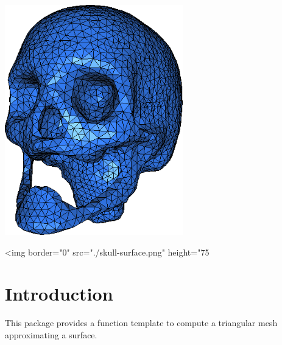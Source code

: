 \label{chapter_SurfaceMesher}



\minitoc


\begin{center}
 \begin{ccTexOnly}
   \includegraphics[height=10cm]{Surface_mesher/skull-surface}
 \end{ccTexOnly}
 \begin{ccHtmlOnly}
   <img border="0" src="./skull-surface.png" height="75%
 \end{ccHtmlOnly}
\end{center}

\section{Introduction}
\label{SurfaceMesher_section_intro}

This package provides a function template
to compute a triangular mesh approximating a surface.

